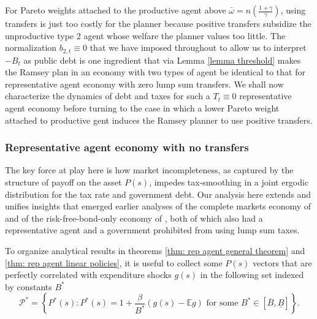 \documentclass[thmsb,11pt]{article}
\begin{document}
For  Pareto weights attached to the productive agent above  $\bar{\omega}=n\left(\frac{1+\gamma}{\gamma}\right)$,
using transfers is just too costly for the planner because positive  transfers   subsidize the unproductive type 2 agent
whose  welfare the planner  values too little. 
 The normalization $b_{2,t} \equiv 0$ that we have imposed throughout to
allow us to interpret $-B_t$ as public debt is one ingredient that via Lemma \ref{lemma threshold} makes the Ramsey plan in an
 economy with two types of agent be identical to that for  representative agent economy with zero lump sum transfers.   
We shall now characterize the dynamics of debt and taxes for such a $T_t \equiv 0$ representative agent economy
before turning to the case in which a lower Pareto weight attached to productive gent induces the Ramsey planner to use positive transfers.
 

\subsubsection{Representative agent economy with no transfers}
The key force at play here is how market incompleteness, as captured by the structure of payoff on the asset $P(s)$, 
impedes  tax-smoothing  in a joint ergodic distribution for the tax rate and government debt.
Our analysis here  extends and unifies  insights that  emerged earlier analyses of  the complete markets economy of \cite{LucasJr.1983} and 
of the risk-free-bond-only economy of  \citep{Aiyagari2002}, both of which also had a representative agent and a government prohibited
from using lump sum taxes. 

To organize analytical results in theorems \ref{thm: rep agent general theorem} and \ref{thm: rep agent linear policies}, it is useful to  collect some  $P(s)$ vectors that are perfectly correlated with expenditure shocks $g(s)$ in the
following  set %
 indexed by  constants $B^*$  %
\begin{equation}\label{eqn:setP}
 \mathcal{P}^*=\left\{P^*(s): P^*(s) = 1+ \frac{\beta}{ B^*}(g(s) - \mathbb{E} g) \text{ for some } B^*\in[\overline{B},\underline{B}] \right\}.
 \end{equation}
\end{document}
